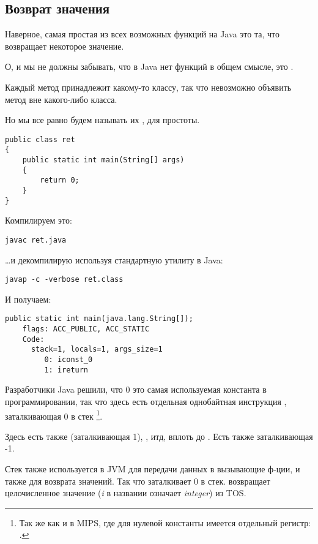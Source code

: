 \subsection{Возврат значения}

Наверное, самая простая из всех возможных функций на Java это та, что возвращает 
некоторое значение.

О, и мы не должны забывать, что в Java нет  функций в общем смысле,
это .

Каждый метод принадлежит какому-то классу, так что невозможно объявить метод 
вне какого-либо класса.

Но мы все равно будем называть их , для простоты.

\begin{lstlisting}[style=customjava]
public class ret
{
	public static int main(String[] args) 
	{
		return 0;
	}
}
\end{lstlisting}

Компилируем это:

\begin{lstlisting}
javac ret.java
\end{lstlisting}

\dots и декомпилирую используя стандартную утилиту в Java:

\begin{lstlisting}
javap -c -verbose ret.class
\end{lstlisting}

И получаем:

\begin{lstlisting}[caption=JDK 1.7 (excerpt)]
  public static int main(java.lang.String[]);
    flags: ACC_PUBLIC, ACC_STATIC
    Code:
      stack=1, locals=1, args_size=1
         0: iconst_0      
         1: ireturn       
\end{lstlisting}

Разработчики Java решили, что 0 это самая используемая константа в программировании,
так что здесь есть отдельная однобайтная инструкция , заталкивающая 0 в стек
\footnote{Так же как и в MIPS, где для нулевой константы имеется отдельный регистр: .}.

Здесь есть также  (заталкивающая 1), , итд, 
вплоть до .
Есть также  заталкивающая -1.

Стек также используется в JVM для передачи данных в вызывающие ф-ции, и также для возврата значений.
Так что  заталкивает 0 в стек.
 возвращает целочисленное значение (\emph{i} в названии означает \emph{integer}) из \ac{TOS}.

